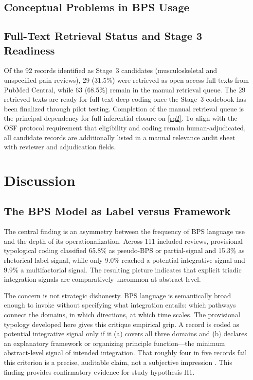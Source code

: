 \documentclass[11pt]{article}
\begin{document}
\subsection{Conceptual Problems in BPS Usage}
\label{subsec:srq1}



\subsection{Full-Text Retrieval Status and Stage 3 Readiness}

Of the 92 records identified as Stage~3 candidates (musculoskeletal and unspecified pain reviews), 29 (31.5\%) were retrieved as open-access full texts from PubMed Central, while 63 (68.5\%) remain in the manual retrieval queue. The 29 retrieved texts are ready for full-text deep coding once the Stage~3 codebook has been finalized through pilot testing. Completion of the manual retrieval queue is the principal dependency for full inferential closure on \ref{rq2}. To align with the OSF protocol requirement that eligibility and coding remain human-adjudicated, all candidate records are additionally listed in a manual relevance audit sheet with reviewer and adjudication fields.

\section{Discussion}
\label{sec:discussion}

\subsection{The BPS Model as Label versus Framework}

The central finding is an asymmetry between the frequency of BPS language use and the depth of its operationalization. Across 111 included reviews, provisional typological coding classified 65.8\% as pseudo-BPS or partial-signal and 15.3\% as rhetorical label signal, while only 9.0\% reached a potential integrative signal and 9.9\% a multifactorial signal. The resulting picture indicates that explicit triadic integration signals are comparatively uncommon at abstract level.

The concern is not strategic dishonesty. BPS language is semantically broad enough to invoke without specifying what integration entails: which pathways connect the domains, in which directions, at which time scales. The provisional typology developed here gives this critique empirical grip. A record is coded as potential integrative signal only if it (a) covers all three domains and (b) declares an explanatory framework or organizing principle function---the minimum abstract-level signal of intended integration. That roughly four in five records fail this criterion is a precise, auditable claim, not a subjective impression \citep{borrell2004, wade2017}. This finding provides confirmatory evidence for study hypothesis H1.
\end{document}
